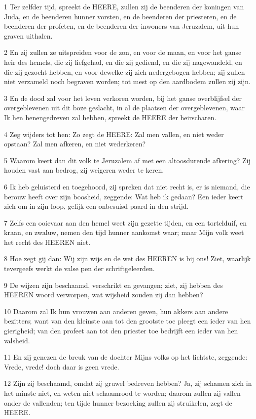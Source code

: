 \par 1 Ter zelfder tijd, spreekt de HEERE, zullen zij de beenderen der koningen van Juda, en de beenderen hunner vorsten, en de beenderen der priesteren, en de beenderen der profeten, en de beenderen der inwoners van Jeruzalem, uit hun graven uithalen.
\par 2 En zij zullen ze uitspreiden voor de zon, en voor de maan, en voor het ganse heir des hemels, die zij liefgehad, en die zij gediend, en die zij nagewandeld, en die zij gezocht hebben, en voor dewelke zij zich nedergebogen hebben; zij zullen niet verzameld noch begraven worden; tot mest op den aardbodem zullen zij zijn.
\par 3 En de dood zal voor het leven verkoren worden, bij het ganse overblijfsel der overgeblevenen uit dit boze geslacht, in al de plaatsen der overgeblevenen, waar Ik hen henengedreven zal hebben, spreekt de HEERE der heirscharen.
\par 4 Zeg wijders tot hen: Zo zegt de HEERE: Zal men vallen, en niet weder opstaan? Zal men afkeren, en niet wederkeren?
\par 5 Waarom keert dan dit volk te Jeruzalem af met een altoosdurende afkering? Zij houden vast aan bedrog, zij weigeren weder te keren.
\par 6 Ik heb geluisterd en toegehoord, zij spreken dat niet recht is, er is niemand, die berouw heeft over zijn boosheid, zeggende: Wat heb ik gedaan? Een ieder keert zich om in zijn loop, gelijk een onbesuisd paard in den strijd.
\par 7 Zelfs een ooievaar aan den hemel weet zijn gezette tijden, en een tortelduif, en kraan, en zwaluw, nemen den tijd hunner aankomst waar; maar Mijn volk weet het recht des HEEREN niet.
\par 8 Hoe zegt gij dan: Wij zijn wijs en de wet des HEEREN is bij ons! Ziet, waarlijk tevergeefs werkt de valse pen der schriftgeleerden.
\par 9 De wijzen zijn beschaamd, verschrikt en gevangen; ziet, zij hebben des HEEREN woord verworpen, wat wijsheid zouden zij dan hebben?
\par 10 Daarom zal Ik hun vrouwen aan anderen geven, hun akkers aan andere bezitters; want van den kleinste aan tot den grootste toe pleegt een ieder van hen gierigheid; van den profeet aan tot den priester toe bedrijft een ieder van hen valsheid.
\par 11 En zij genezen de breuk van de dochter Mijns volks op het lichtste, zeggende: Vrede, vrede! doch daar is geen vrede.
\par 12 Zijn zij beschaamd, omdat zij gruwel bedreven hebben? Ja, zij schamen zich in het minste niet, en weten niet schaamrood te worden; daarom zullen zij vallen onder de vallenden; ten tijde hunner bezoeking zullen zij struikelen, zegt de HEERE.
